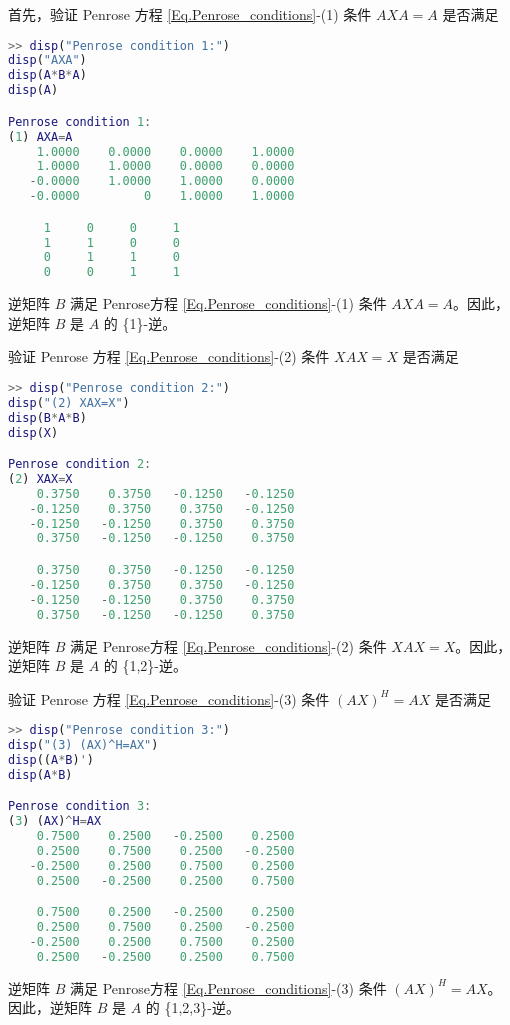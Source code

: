 首先，验证 Penrose 方程 \ref{Eq.Penrose_conditions}-(1) 条件 $AXA = A$ 是否满足
\begin{lstlisting}[language=Matlab]
>> disp("Penrose condition 1:")
disp("AXA")
disp(A*B*A)
disp(A)

Penrose condition 1:
(1) AXA=A
    1.0000    0.0000    0.0000    1.0000
    1.0000    1.0000    0.0000    0.0000
   -0.0000    1.0000    1.0000    0.0000
   -0.0000         0    1.0000    1.0000

     1     0     0     1
     1     1     0     0
     0     1     1     0
     0     0     1     1
\end{lstlisting}
逆矩阵 $B$ 满足 Penrose方程 \ref{Eq.Penrose_conditions}-(1) 条件 $AXA = A$。因此，逆矩阵 $B$ 是 $A$ 的 \{1\}-逆。

验证 Penrose 方程 \ref{Eq.Penrose_conditions}-(2) 条件 $XAX = X$ 是否满足
\begin{lstlisting}[language=Matlab]
>> disp("Penrose condition 2:")
disp("(2) XAX=X")
disp(B*A*B)
disp(X)

Penrose condition 2:
(2) XAX=X
    0.3750    0.3750   -0.1250   -0.1250
   -0.1250    0.3750    0.3750   -0.1250
   -0.1250   -0.1250    0.3750    0.3750
    0.3750   -0.1250   -0.1250    0.3750

    0.3750    0.3750   -0.1250   -0.1250
   -0.1250    0.3750    0.3750   -0.1250
   -0.1250   -0.1250    0.3750    0.3750
    0.3750   -0.1250   -0.1250    0.3750
\end{lstlisting}
逆矩阵 $B$ 满足 Penrose方程 \ref{Eq.Penrose_conditions}-(2) 条件 $XAX = X$。因此，逆矩阵 $B$ 是 $A$ 的 \{1,2\}-逆。

验证 Penrose 方程 \ref{Eq.Penrose_conditions}-(3) 条件 $(AX)^H = AX$ 是否满足
\begin{lstlisting}[language=Matlab]
>> disp("Penrose condition 3:")
disp("(3) (AX)^H=AX")
disp((A*B)')
disp(A*B)

Penrose condition 3:
(3) (AX)^H=AX
    0.7500    0.2500   -0.2500    0.2500
    0.2500    0.7500    0.2500   -0.2500
   -0.2500    0.2500    0.7500    0.2500
    0.2500   -0.2500    0.2500    0.7500

    0.7500    0.2500   -0.2500    0.2500
    0.2500    0.7500    0.2500   -0.2500
   -0.2500    0.2500    0.7500    0.2500
    0.2500   -0.2500    0.2500    0.7500
\end{lstlisting}
逆矩阵 $B$ 满足 Penrose方程 \ref{Eq.Penrose_conditions}-(3) 条件 $(AX)^H = AX$。因此，逆矩阵 $B$ 是 $A$ 的 \{1,2,3\}-逆。

